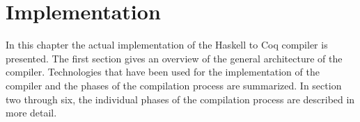 \chapter{Implementation} \label{chp:implementation}
In this chapter the actual implementation of the Haskell to Coq compiler is presented.
The first section gives an overview of the general architecture of the compiler.
Technologies that have been used for the implementation of the compiler and the phases of the compilation process are summarized.
In section two through six, the individual phases of the compilation process are described in more detail.








